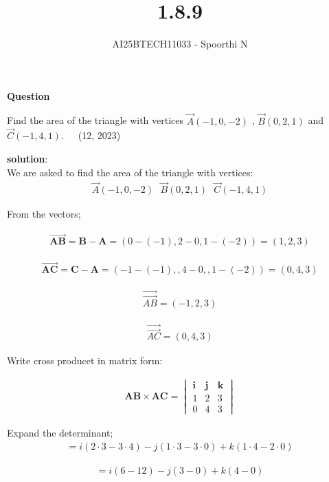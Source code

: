 \documentclass{beamer}
\title{1.8.9}
\author{AI25BTECH11033 - Spoorthi N}
\theoremstyle{remark}
\let\vec\mathbf
\numberwithin{equation}{section}
\begin{document}
{\let\newpage\relax\maketitle}
\renewcommand{\thefigure}{\theenumi}
\renewcommand{\thetable}{\theenumi}

\textbf{Question}

\noindent Find the area of the triangle with vertices $\Vec{A}(-1 , 0 , -2)$ , $\Vec{B}(0 , 2 , 1)$ and $\Vec{C}(-1 , 4 , 1)$. \,\,\,\,\, (12, 2023)


\textbf{solution}:\\


We are asked to find the area of the triangle with vertices:
\begin{align} 
\Vec{A}(-1 , 0 ,-2) \,\,\,\,  \Vec{B}(0,2,1) \,\,\,\, \Vec{C}(-1,4,1)
\end{align}

From the vectors;

\begin{align}
\overrightarrow{\vec{AB}}= \vec{B} - \vec{A} = (0-(-1), 2-0,1-(-2))=(1 , 2, 3)
\end{align}


\begin{align}
\overrightarrow{\vec{AC}}= \vec{C} - \vec{A}=(-1-(-1),,4-0,,1-(-2))=(0 , 4 , 3)
\end{align}

\begin{align}
\overrightarrow{\Vec{AB}}=(-1, 2 ,3) 
\end{align}

\begin{align}
\overrightarrow{\Vec{AC}}=(0,4,3) 
\end{align}

Write cross producet in matrix form:

\begin{align}
\vec{AB} \times \vec{AC} =
\begin{vmatrix}
\mathbf{i} & \mathbf{j} & \mathbf{k} \\
1 & 2 & 3 \\
0 & 4 & 3
\end{vmatrix}
\end{align}

Expand the determinant;
\begin{align}
= i(2 \cdot 3 - 3 \cdot 4) - j(1 \cdot 3 - 3 \cdot 0) + k(1 \cdot 4 - 2 \cdot 0)
\end{align}

\begin{align}
= i(6 - 12) - j(3 - 0) + k(4 - 0)
\end{align}
\end{document}
